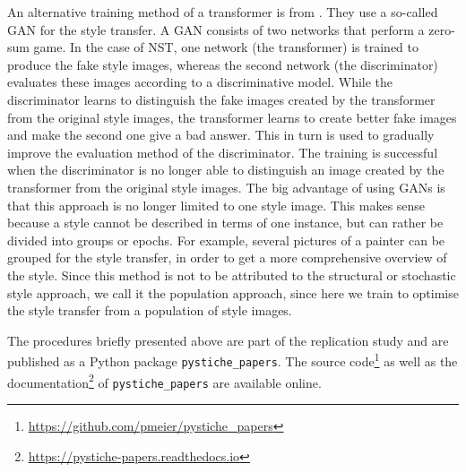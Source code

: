 An alternative training method of a transformer is from  \cite{SKLO2018}. They use a so-called \gls{GAN} for the style transfer. A \gls{GAN} consists of two networks that perform a zero-sum game. In the case of \gls{NST}, one network (the transformer) is trained to produce the fake style images, whereas the second network (the discriminator) evaluates these images according to a discriminative model. While the discriminator learns to distinguish the fake images created by the transformer from the original style images, the transformer learns to create better fake images and make the second one give a bad answer. This in turn is used to gradually improve the evaluation method of the discriminator. The training is successful when the discriminator is no longer able to distinguish an image created by the transformer from the original style images. The big advantage of using \glspl{GAN} is that this approach is no longer limited to one style image. This makes sense because a style cannot be described in terms of one instance, but can rather be divided into groups or epochs. For example, several pictures of a painter can be grouped for the style transfer, in order to get a more comprehensive overview of the style. Since this method is not to be attributed to the structural or stochastic style approach, we call it the population approach, since here we train to optimise the style transfer from a population of style images.

The procedures briefly presented above are part of the replication study and are published as a Python package \texttt{pystiche\_papers}. The source code\footnote{\url{https://github.com/pmeier/pystiche_papers}} as well as the documentation\footnote{\url{https://pystiche-papers.readthedocs.io}} of \texttt{pystiche\_papers} are available online. 